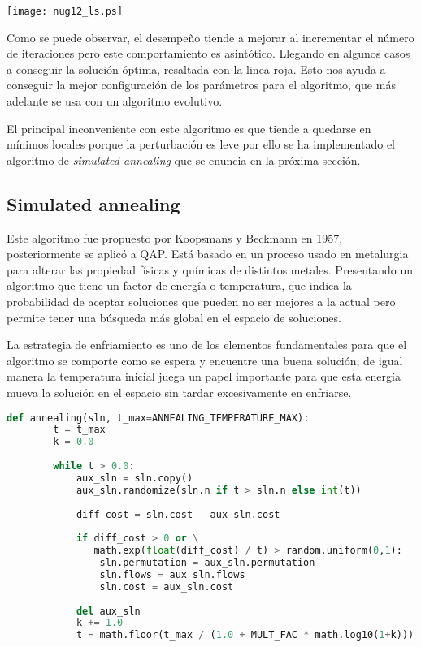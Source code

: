 \begin{center}
    \texttt{[image: nug12\_ls.ps]}
\end{center}

Como se puede observar, el desempeño tiende a mejorar al incrementar el número de iteraciones pero este comportamiento es asintótico. Llegando en algunos casos a conseguir la solución óptima, resaltada con la linea roja. Esto nos ayuda a conseguir la mejor configuración de los parámetros para el algoritmo, que más adelante se usa con un algoritmo evolutivo.

El principal inconveniente con este algoritmo es que tiende a quedarse en mínimos locales porque la perturbación es leve por ello se ha implementado el algoritmo de \textit{simulated annealing} que se enuncia en la próxima sección.

\subsection*{Simulated annealing}

Este algoritmo fue propuesto por Koopsmans y Beckmann en 1957\cite{koopmans1957assignment}, posteriormente se aplicó a QAP. Está basado en un proceso usado en metalurgia para alterar las propiedad físicas y químicas de distintos metales. Presentando un algoritmo que tiene un factor de energía o temperatura, que indica la probabilidad de aceptar soluciones que pueden no ser mejores a la actual pero permite tener una búsqueda más global en el espacio de soluciones\cite{sm:10:advcomp}.

La estrategia de enfriamiento es uno de los elementos fundamentales para que el algoritmo se comporte como se espera y encuentre una buena solución, de igual manera la temperatura inicial juega un papel importante para que esta energía mueva la solución en el espacio sin tardar excesivamente en enfriarse.

\newpage

\begin{lstlisting}[language=Python]
    def annealing(sln, t_max=ANNEALING_TEMPERATURE_MAX):
        t = t_max
        k = 0.0
    
        while t > 0.0:
            aux_sln = sln.copy()
            aux_sln.randomize(sln.n if t > sln.n else int(t))
    
            diff_cost = sln.cost - aux_sln.cost
    
            if diff_cost > 0 or \
               math.exp(float(diff_cost) / t) > random.uniform(0,1):
                sln.permutation = aux_sln.permutation
                sln.flows = aux_sln.flows
                sln.cost = aux_sln.cost
    
            del aux_sln
            k += 1.0
            t = math.floor(t_max / (1.0 + MULT_FAC * math.log10(1+k)))
\end{lstlisting}


